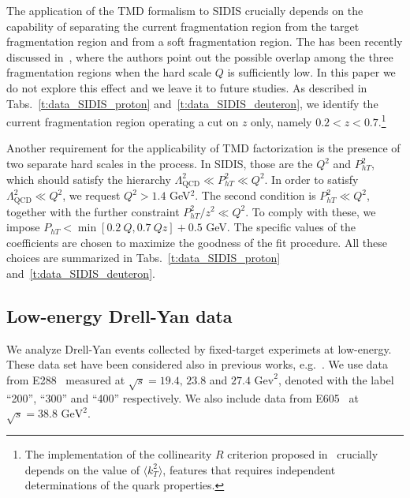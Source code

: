 \documentclass[aps,preprintnumbers,showpacs,nofootinbib,superscriptaddress,floatfix]{revtex4}
\begin{document}
The application of the TMD formalism to SIDIS crucially depends on the capability of separating the current fragmentation region from the target fragmentation region and from a soft fragmentation region. The has been recently discussed in~\cite{Boglione:2016bph}, where the authors point out the possible overlap among the three fragmentation regions when the hard scale $Q$ is sufficiently low. 
In this paper we do not explore this effect and we leave it to future studies. As described in Tabs.~\ref{t:data_SIDIS_proton} and~\ref{t:data_SIDIS_deuteron}, we identify the current fragmentation region operating a cut on $z$ only, namely $0.2 < z < 0.7$.\footnote{The implementation of the collinearity $R$ criterion proposed in~\cite{Boglione:2016bph} crucially depends on the value of $\langle k_T^2 \rangle$, features that requires independent determinations of the quark properties.}

Another requirement for the applicability of TMD factorization is the presence of two separate hard scales in the process. In SIDIS, those are the $Q^2$ and $P_{hT}^2$, which should satisfy the hierarchy $\Lambda_{\text{QCD}}^2 \ll P_{hT}^2 \ll Q^2$. 
In order to satisfy $\Lambda_{\text{QCD}}^2 \ll Q^2$, we request $Q^2 > 1.4$ GeV$^2$. 
The second condition is $P_{hT}^2 \ll Q^2$, together with the further constraint  $P_{hT}^2/z^2 \ll Q^2$. To comply with these, we impose $P_{hT} < \min[0.2\ Q, 0.7\ Qz] + 0.5$ GeV. The specific values of the coefficients are chosen to maximize the goodness of the fit procedure. 
All these choices are summarized in Tabs.~\ref{t:data_SIDIS_proton} and~\ref{t:data_SIDIS_deuteron}.

\subsection{Low-energy Drell-Yan data}
\label{ss:dy}

We analyze Drell-Yan events collected by fixed-target experimets at low-energy. These data set have been considered also in previous works, e.g.~\cite{DAlesio:2014mrz}. 
We use data from E288~\cite{Ito:1980ev} measured at $\sqrt{s}=19.4,\,23.8$ and $27.4\text{ Gev}^2$, denoted with the label ``200'', ``300'' and ``400'' respectively. 
We also include data from E605~\cite{Moreno:1990sf} at $\sqrt{s}=38.8 \text{ GeV}^2$.
\end{document}
